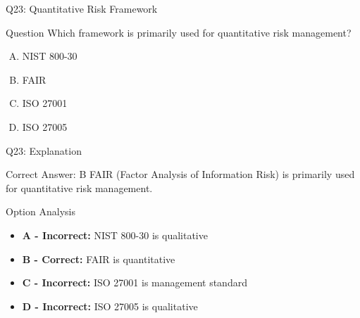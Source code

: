 \documentclass{beamer}
\begin{document}
	\begin{frame}{Q23: Quantitative Risk Framework}
		\begin{block}{Question}
			Which framework is primarily used for quantitative risk management?
		\end{block}
		\begin{enumerate}[(A)]
			\item NIST 800-30
			\item FAIR
			\item ISO 27001
			\item ISO 27005
		\end{enumerate}
	\end{frame}
	
	\begin{frame}{Q23: Explanation}
		\begin{block}{Correct Answer: B}
			FAIR (Factor Analysis of Information Risk) is primarily used for quantitative risk management.
		\end{block}
		\begin{block}{Option Analysis}
			\begin{itemize}
				\item \textbf{A - Incorrect:} NIST 800-30 is qualitative
				\item \textbf{B - Correct:} FAIR is quantitative
				\item \textbf{C - Incorrect:} ISO 27001 is management standard
				\item \textbf{D - Incorrect:} ISO 27005 is qualitative
			\end{itemize}
		\end{block}
	\end{frame}
	
\end{document}
